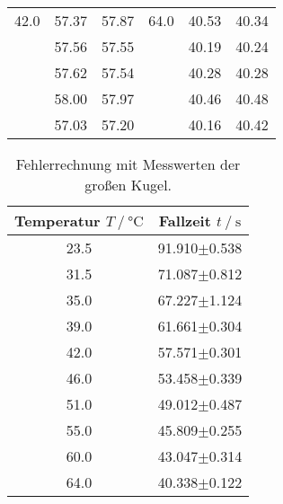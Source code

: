 \begin{table}
\begin{tabular}{c c c c c c}
                                                    \\
        42.0 & 57.37 & 57.87 & 64.0 & 40.53 & 40.34 \\
             & 57.56 & 57.55 &      & 40.19 & 40.24 \\
             & 57.62 & 57.54 &      & 40.28 & 40.28 \\
             & 58.00 & 57.97 &      & 40.46 & 40.48 \\
             & 57.03 & 57.20 &      & 40.16 & 40.42 \\
        \bottomrule
    \end{tabular}    
\end{table}

\begin{table}
    \centering
    \caption{Fehlerrechnung mit Messwerten der großen Kugel.}
    \label{tab:mess_klKugel_raum}
    \begin{tabular}{c c}
        \toprule
        {Temperatur $T\:/\:\si{\celsius}$} & {Fallzeit $t\:/\:\si{\second}$} \\
        \midrule
        23.5 & 91.910$\pm$0.538 \\
        31.5 & 71.087$\pm$0.812 \\
        35.0 & 67.227$\pm$1.124 \\
        39.0 & 61.661$\pm$0.304 \\
        42.0 & 57.571$\pm$0.301 \\
        46.0 & 53.458$\pm$0.339 \\
        51.0 & 49.012$\pm$0.487 \\
        55.0 & 45.809$\pm$0.255 \\
        60.0 & 43.047$\pm$0.314 \\
        64.0 & 40.338$\pm$0.122 \\
        \bottomrule
    \end{tabular}    
\end{table}